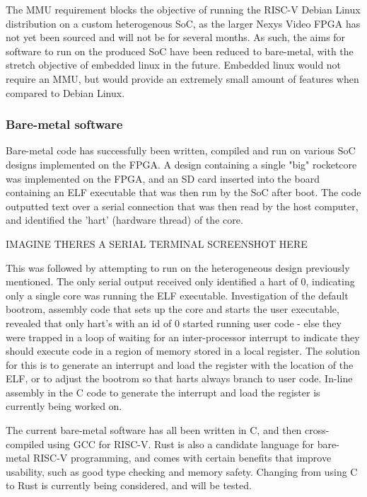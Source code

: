 The MMU requirement blocks the objective of running the RISC-V Debian Linux distribution on a custom heterogenous SoC, as the larger Nexys Video FPGA has not yet been sourced and will not be for several months. As such, the aims for software to run on the produced SoC have been reduced to bare-metal, with the stretch objective of embedded linux in the future. Embedded linux would not require an MMU, but would provide an extremely small amount of features when compared to Debian Linux.

\subsubsection{Bare-metal software}
Bare-metal code has successfully been written, compiled and run on various SoC designs implemented on the FPGA. A design containing a single "big" rocketcore was implemented on the FPGA, and an SD card inserted into the board containing an ELF executable that was then run by the SoC after boot. The code outputted text over a serial connection that was then read by the host computer, and identified the 'hart' (hardware thread) of the core.

IMAGINE THERES A SERIAL TERMINAL SCREENSHOT HERE

This was followed by attempting to run on the heterogeneous design previously mentioned. The only serial output received only identified a hart of 0, indicating only a single core was running the ELF executable. Investigation of the default bootrom, assembly code that sets up the core and starts the user executable, revealed that only hart's with an id of 0 started running user code - else they were trapped in a loop of waiting for an inter-processor interrupt to indicate they should execute code in a region of memory stored in a local register. The solution for this is to generate an interrupt and load the register with the location of the ELF, or to adjust the bootrom so that harts always branch to user code. In-line assembly in the C code to generate the interrupt and load the register is currently being worked on.

The current bare-metal software has all been written in C, and then cross-compiled using GCC for RISC-V. Rust is also a candidate language for bare-metal RISC-V programming\cite{}, and comes with certain benefits that improve usability, such as good type checking and memory safety. Changing from using C to Rust is currently being considered, and will be tested.